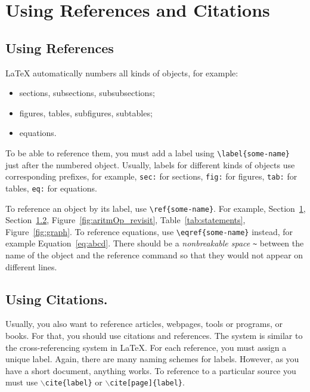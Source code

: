 \section{Using References and Citations}
\label{sec:refs-cites}

\subsection{Using References}
LaTeX automatically numbers all kinds of objects, for example:
\begin{itemize}
    \item sections, subsections, subsubsections;
    \item figures, tables, subfigures, subtables;
    \item equations.
\end{itemize}
To be able to reference them, you must add a label using \verb|\label{some-name}| just after the numbered object.
Usually, labels for different kinds of objects use corresponding prefixes, for example, \verb|sec:| for sections, \verb|fig:| for figures, \verb|tab:| for tables, \verb|eq:| for equations.

To reference an object by its label, use \verb|\ref{some-name}|.
For example, Section~\ref{sec:refs-cites}, Section~\ref{sec:cites}, Figure~\ref{fig:aritmOp_revisit}, Table~\ref{tab:statements}, Figure~\ref{fig:graph}.
To reference equations, use \verb|\eqref{some-name}| instead, for example Equation~\eqref{eq:abcd}.
There should be a \emph{nonbreakable space} \verb|~| between the name of the object and the reference command so that they would not appear on different lines.


\subsection{Using Citations.}
\label{sec:cites}

Usually, you also want to reference articles, webpages, tools or programs, or books. For that, you should use citations and references. The system is similar to the cross-referencing system in LaTeX. For each reference, you must assign a unique label. Again, there are many naming schemes for labels. However, as you have a short document, anything works. To reference to a particular source you must use \texttt{$\backslash$cite\{label\}} or \texttt{$\backslash$cite[page]\{label\}}.

